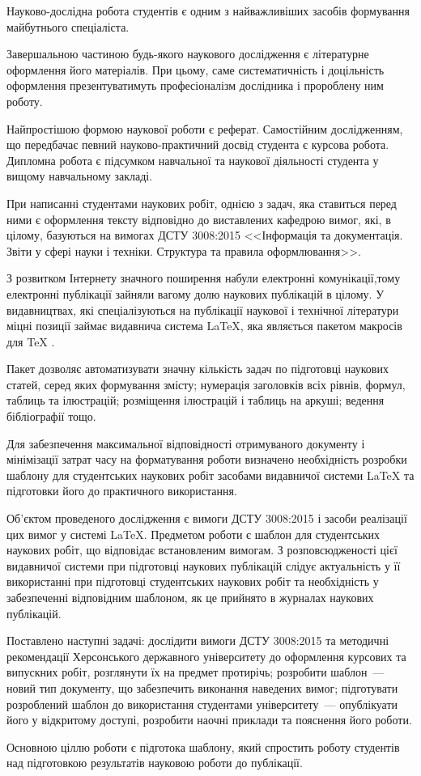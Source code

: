 
Науково-дослідна робота студентів є одним з найважливіших засобів формування майбутнього спеціаліста.

Завершальною частиною будь-якого наукового дослідження є літературне оформлення його матеріалів. При цьому, саме систематичність і доцільність оформлення презентуватимуть професіоналізм дослідника і пророблену ним роботу.

Найпростішою формою наукової роботи є реферат. Самостійним   дослідженням, що передбачає певний науково-практичний досвід студента є курсова робота. Дипломна робота є підсумком навчальної та  наукової діяльності студента у вищому навчальному закладі.

При написанні студентами наукових робіт, однією з задач, яка ставиться перед ними є оформлення тексту відповідно до виставлених кафедрою вимог, які, в цілому, базуються на вимогах ДСТУ 3008:2015 <<Інформація та документація. Звіти у сфері науки і техніки. Структура та правила оформлювання>>.

З розвитком Інтернету значного поширення набули електронні комунікації,тому електронні публікації зайняли вагому долю наукових публікацій в цілому. У видавництвах, які спеціалізуються на публікації наукової і технічної літератури міцні позиції займає видавнича система  \LaTeX{}, яка являється пакетом макросів для \TeX{} \cite{Knuth1984TheTeXbook}.

Пакет дозволяє автоматизувати значну кількість задач по підготовці наукових статей, серед яких формування змісту; нумерація заголовків всіх рівнів, формул, таблиць та ілюстрацій; розміщення ілюстрацій і таблиць на аркуші; ведення бібліографії тощо.

Для забезпечення максимальної відповідності отримуваного документу і мінімізації затрат часу на форматування роботи визначено необхідність розробки шаблону для студентських наукових робіт засобами видавничої системи \LaTeX{} та підготовки його до практичного використання.

Об'єктом проведеного дослідження є вимоги ДСТУ 3008:2015 і засоби реалізації цих вимог у системі \LaTeX{}. Предметом роботи є шаблон  для студентських наукових робіт, що відповідає встановленим вимогам. З розповсюдженості цієї видавничої системи при підготовці наукових публікацій слідує актуальність у її використанні при підготовці студентських наукових робіт та необхідність у забезпеченні відповідним шаблоном, як це прийнято в журналах наукових публікацій. 

Поставлено наступні задачі: дослідити вимоги ДСТУ 3008:2015 та методичні рекомендації Херсонського державного університету до оформлення курсових та випускних робіт, розглянути їх на предмет протирічь; розробити шаблон~--- новий тип документу, що забезпечить виконання наведених вимог; підготувати розроблений шаблон до використання студентами університету~--- опублікуати його у відкритому доступі, розробити наочні приклади та пояснення його роботи.

Основною ціллю роботи є підготока шаблону, який спростить роботу студентів над підготовкою результатів науковою роботи до публікації.